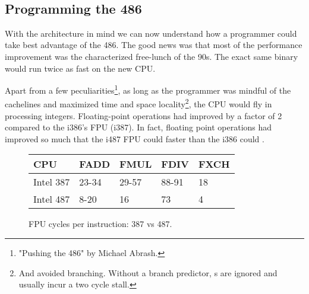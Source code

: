 \par



\begin{figure}[H]
\centering
{}
\end{figure}
\par
\begin{figure}[H]
\centering
{}
\end{figure}





\\
\par
\subsection{Programming the 486}
With the architecture in mind we can now understand how a programmer could take best advantage of the 486. The good news was that most of the performance improvement was the characterized free-lunch of the 90s. The exact same binary would run twice as fast on the new CPU.\\
\par
Apart from a few peculiarities\footnote{"Pushing the 486" by Michael Abrash.}, as long as the programmer was mindful of the cachelines and maximized time and space locality\footnote{And avoided branching. Without a branch predictor, s are ignored and usually incur a two cycle stall.}, the CPU would fly in processing integers. Floating-point operations had improved by a factor of 2 compared to the i386's FPU (i387). In fact, floating point operations had improved so much that the i487 FPU could  faster than the i386 could .\\
\par
\begin{figure}[H]
\centering
\begin{tabularx}{\textwidth}{ X  X X  X  X}
  \toprule
  \textbf{CPU} & \textbf{FADD} & \textbf{FMUL} & \textbf{FDIV} &\textbf{FXCH} \\
  \toprule
Intel 387 & 23-34 & 29-57   & 88-91 & 18 \\
Intel 487 & 8-20  & 16   & 73 & 4 \\ \bottomrule
\end{tabularx}
\caption{FPU cycles per instruction: 387 vs 487.}

\end{figure}

